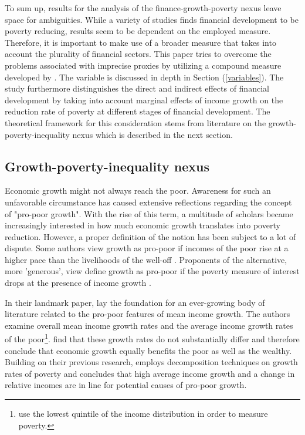 \documentclass[12pt, a4paper]{article}
\begin{document}
To sum up, results for the analysis of the finance-growth-poverty nexus leave space for ambiguities. While a variety of studies finds financial development to be poverty reducing, results seem to be dependent on the employed measure. Therefore, it is important to make use of a broader measure that takes into account the plurality of financial sectors. This paper tries to overcome the problems associated with imprecise proxies by utilizing a compound measure developed by . The variable is discussed in depth in Section (\ref{variables}). The study furthermore distinguishes the direct and indirect effects of financial development by taking into account marginal effects of income growth on the reduction rate of poverty at different stages of financial development. The theoretical framework for this consideration stems from literature on the growth-poverty-inequality nexus which is described in the next section.


\subsection{Growth-poverty-inequality nexus} \label{g-p-i}

Economic growth might not always reach the poor. Awareness for such an unfavorable circumstance has caused extensive reflections regarding the concept of "pro-poor growth". With the rise of this term, a multitude of scholars became increasingly interested in how much economic growth translates into poverty reduction. However, a proper definition of the notion has been subject to a lot of dispute. Some authors view growth as pro-poor if incomes of the poor rise at a higher pace than the livelihoods of the well-off \cite{baulch2000, kakwani2000}. Proponents of the alternative, more 'generous', view define growth as pro-poor if the poverty measure of interest drops at the presence of income growth \cite{ravallion2003}.

In their landmark paper,  lay the foundation for an ever-growing body of literature related to the pro-poor features of mean income growth. The authors examine overall mean income growth rates and the average income growth rates of the poor\footnote{ use the lowest quintile of the income distribution in order to measure poverty.}.  find that these growth rates do not substantially differ and therefore conclude that economic growth equally benefits the poor as well as the wealthy. Building on their previous research,  employs decomposition techniques on growth rates of poverty and concludes that high average income growth and a change in relative incomes are in line for potential causes of pro-poor growth.
\end{document}
